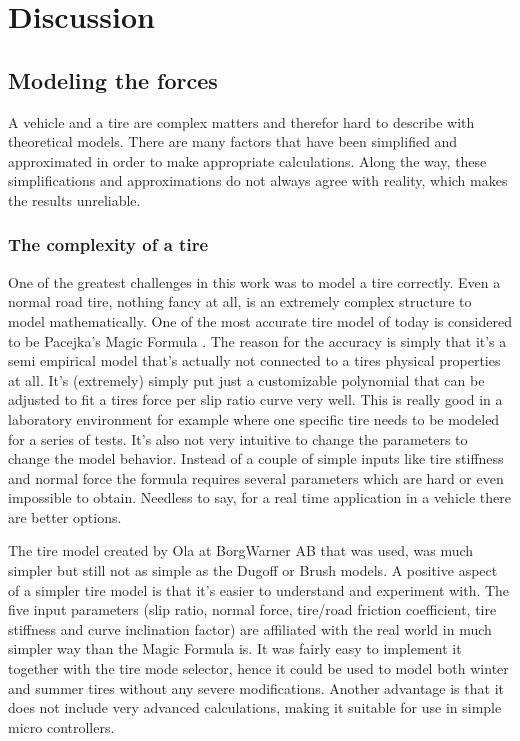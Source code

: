 \chapter{Discussion}

\section{Modeling the forces}
A vehicle and a tire are complex matters and therefor hard to describe with theoretical models. There are many factors that have been simplified and approximated in order to make appropriate calculations. Along the way, these simplifications and approximations do not always agree with reality, which makes the results unreliable. 

\subsection{The complexity of a tire}
One of the greatest challenges in this work was to model a tire correctly. Even a normal road tire, nothing fancy at all, is an extremely complex structure to model mathematically. One of the most accurate tire model of today is considered to be Pacejka's Magic Formula \cite{pacejka}. The reason for the accuracy is simply that it's a semi empirical model that's actually not connected to a tires physical properties at all. It's (extremely) simply put just a customizable polynomial that can be adjusted to fit a tires force per slip ratio curve very well. This is really good in a laboratory environment for example where one specific tire needs to be modeled for a series of tests. It's also not very intuitive to change the parameters to change the model behavior. Instead of a couple of simple inputs like tire stiffness and normal force the formula requires several parameters which are hard or even impossible to obtain. Needless to say, for a real time application in a vehicle there are better options.

The tire model created by Ola at BorgWarner AB that was used, was much simpler but still not as simple as the Dugoff or Brush models. A positive aspect of a simpler tire model is that it's easier to understand and experiment with. The five input parameters (slip ratio, normal force, tire/road friction coefficient, tire stiffness and curve inclination factor) are affiliated with the real world in much simpler way than the Magic Formula is. It was fairly easy to implement it together with the tire mode selector, hence it could be used to model both winter and summer tires without any severe modifications. Another advantage is that it does not include very advanced calculations, making it suitable for use in simple micro controllers. 

